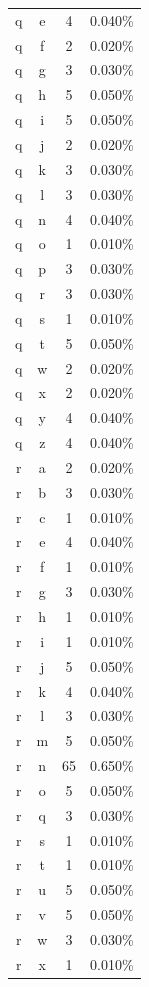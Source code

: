 \begin{longtable}{cccc}
    q & e & 4 & 0.040\% \\
    q & f & 2 & 0.020\% \\
    q & g & 3 & 0.030\% \\
    q & h & 5 & 0.050\% \\
    q & i & 5 & 0.050\% \\
    q & j & 2 & 0.020\% \\
    q & k & 3 & 0.030\% \\
    q & l & 3 & 0.030\% \\
    q & n & 4 & 0.040\% \\
    q & o & 1 & 0.010\% \\
    q & p & 3 & 0.030\% \\
    q & r & 3 & 0.030\% \\
    q & s & 1 & 0.010\% \\
    q & t & 5 & 0.050\% \\
    q & w & 2 & 0.020\% \\
    q & x & 2 & 0.020\% \\
    q & y & 4 & 0.040\% \\
    q & z & 4 & 0.040\% \\
    r & a & 2 & 0.020\% \\
    r & b & 3 & 0.030\% \\
    r & c & 1 & 0.010\% \\
    r & e & 4 & 0.040\% \\
    r & f & 1 & 0.010\% \\
    r & g & 3 & 0.030\% \\
    r & h & 1 & 0.010\% \\
    r & i & 1 & 0.010\% \\
    r & j & 5 & 0.050\% \\
    r & k & 4 & 0.040\% \\
    r & l & 3 & 0.030\% \\
    r & m & 5 & 0.050\% \\
    r & n & 65 & 0.650\% \\
    r & o & 5 & 0.050\% \\
    r & q & 3 & 0.030\% \\
    r & s & 1 & 0.010\% \\
    r & t & 1 & 0.010\% \\
    r & u & 5 & 0.050\% \\
    r & v & 5 & 0.050\% \\
    r & w & 3 & 0.030\% \\
    r & x & 1 & 0.010\% \\

\end{longtable}
